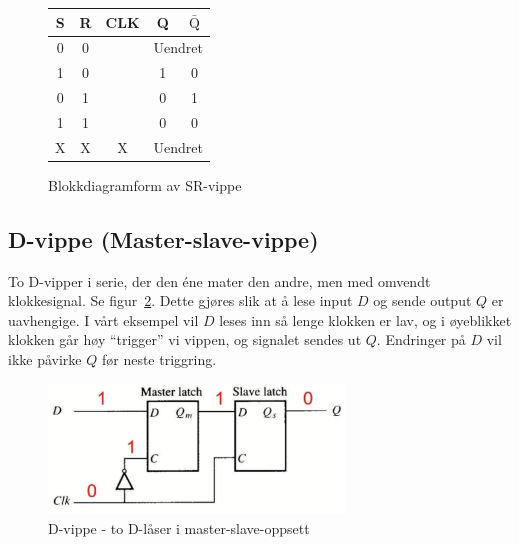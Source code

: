 \documentclass[12pt,a4paper,norsk]{article}
\newcommand{\red}[1]{{\color{Red}#1}}
\newcommand{\rising}{\texttiming{[-,timing/slope=0]LH}}
\begin{document}
\begin{figure}[hbt!]
  \centering
  \begin{minipage}{.45\textwidth}
    \centering
    \caption{Blokkdiagramform av SR-vippe\label{fig:SR-flip-flop-block}}
  \end{minipage}\hfill
  \begin{minipage}{.45\textwidth}
    \centering
    \begin{tabular}{ccc|cc}
      \toprule
      S & R & CLK & Q & $\bar{\text{Q}}$ \\
      \midrule
      0 & 0 & \rising{} & \multicolumn{2}{c}{Uendret} \\
      1 & 0 & \rising{} & 1 & 0 \\
      0 & 1 & \rising{} & 0 & 1 \\
      1 & 1 & \rising{} & \red{0} & \red{0} \\
      X & X & X & \multicolumn{2}{c}{Uendret} \\
      \bottomrule
    \end{tabular}
  \end{minipage}
\end{figure}

\subsection{D-vippe (Master-slave-vippe)}
To D-vipper i serie, der den éne mater den andre, men med omvendt klokkesignal. Se
figur~\ref{fig:master_slave}. Dette gjøres slik at å lese input $D$ og sende
output $Q$ er uavhengige. I vårt eksempel vil $D$ leses inn så lenge
klokken er lav, og i øyeblikket klokken går høy ``trigger'' vi vippen, og
signalet sendes ut $Q$. Endringer på $D$ vil ikke påvirke $Q$ før
neste triggring.

\begin{figure}[hbt!]
  \centering
  \includegraphics[width=0.7\textwidth,height=\textheight,keepaspectratio]{Krets_MasterSlave}
  \caption{D-vippe - to D-låser i master-slave-oppsett\label{fig:master_slave}}
\end{figure}
\end{document}
